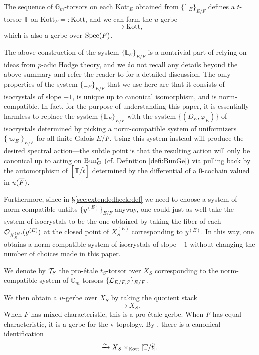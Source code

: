 The sequence of $\mathbb{G}_{m}$-torsors on each $\mathrm{Kott}_{E}$ obtained from $\{\mathbb{L}_{E}\}_{E/F}$ defines a $t$-torsor $\mathbb{T}$ on $\mathrm{Kott}_{F} =: \mathrm{Kott}$, and we can form the $u$-gerbe 
\begin{equation*}
[\mathbb{T}/\tilde{t}] \to \mathrm{Kott},
\end{equation*}
which is also a gerbe over $\mathrm{Spec}(F)$.

\begin{rque}
    The above construction of the system $\{\mathbb{L}_{E}\}_{E/F}$ is a nontrivial part of \cite{Fargues22} relying on ideas from $p$-adic Hodge theory, and we do not recall any details beyond the above summary and refer the reader to \cite[\S 4.1]{Fargues22} for a detailed discussion. The only properties of the system $\{\mathbb{L}_{E}\}_{E/F}$ that we use here are that it consists of isocrystals of slope $-1$, is unique up to canonical isomorphism, and is norm-compatible. In fact, for the purpose of understanding this paper, it is essentially harmless to replace the system $\{\mathbb{L}_{E}\}_{E/F}$ with the system $\{(D_{E}, \varphi_{E})\}$ of isocrystals determined by picking a norm-compatible system of uniformizers $\{\varpi_{E}\}_{E/F}$ for all finite Galois $E/F$. Using this system instead will produce the desired spectral action---the subtle point is that the resulting action will only be canonical up to acting on $\mathrm{Bun}_{G}^{e}$ (cf. Definition \ref{defi:BunGe}) via pulling back by the automorphism of $[\mathbb{T}/\tilde{t}]$ determined by the differential of a $0$-cochain valued in $u(\overline{F})$.
    
    Furthermore, since in \S \ref{sec:extendedheckedef} we need to choose a system of norm-compatible untilts $\{y^{(E)}\}_{E/F}$ anyway, one could just as well take the system of isocrystals to be the one obtained by taking the fiber of each $\mathcal{O}_{X_{S}^{(E)}}(y^{(E)})$ at the closed point of $X_{S}^{(E)}$ corresponding to $y^{(E)}$. In this way, one obtains a norm-compatible system of isocrystals of slope $-1$ without changing the number of choices made in this paper. 
    \end{rque}

\begin{defi}\label{defi:Tdef}
We denote by $\mathcal{T}_{S}$ the pro-\'{e}tale $t_{S}$-torsor over $X_{S}$ corresponding to the norm-compatible system of $\mathbb{G}_{m}$-torsors $\{\mathcal{L}_{E/F,S}\}_{E/F}$.
\end{defi}

We then obtain a $u$-gerbe over $X_{S}$ by taking the quotient stack
\begin{equation*}
    [\mc{T}_{S}/\tilde{t}_{S}] \to X_{S}.
\end{equation*}
When $F$ has mixed characteristic, this is a pro-\'{e}tale gerbe. When $F$ has equal characteristic, it is a gerbe for the v-topology. By \cite[Corollaire 7.4]{Fargues22}, there is a canonical identification
\begin{equation*}
    [\mc{T}_{S}/\tilde{t}_{S}] \xrightarrow{\sim} X_{S} \times_{\Kott} [\mathbb{T}/\tilde{t}].
\end{equation*}

